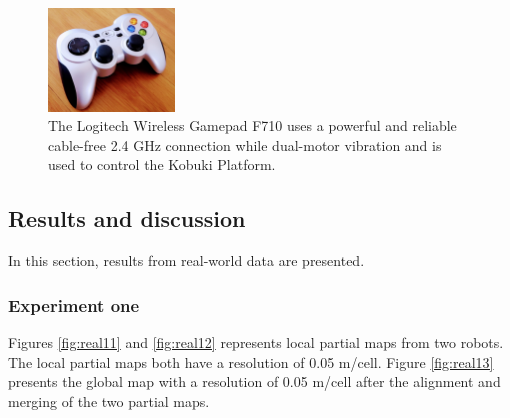 \begin{figure}[H]
    \centering
    \includegraphics[width=0.3\textwidth]{figs/real_world_results/logitech_controller.jpg}
    \caption{The Logitech Wireless Gamepad F710 uses a powerful and reliable cable-free 2.4 GHz connection while dual-motor vibration and is used to control the Kobuki Platform.}
    \label{fig:logitech_controller}
\end{figure}


\subsection{Results and discussion}

In this section, results from real-world data are presented.

\subsubsection{Experiment one} %

Figures \ref{fig:real11} and \ref{fig:real12} represents local partial maps from two robots. The local partial maps both have a resolution of 0.05 m/cell. Figure \ref{fig:real13} presents the global map with a resolution of 0.05 m/cell after the alignment and merging of the two partial maps. 

